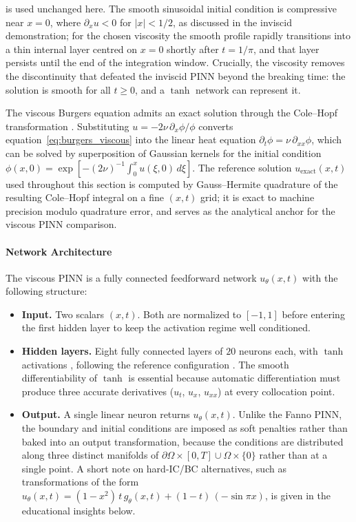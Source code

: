\documentclass[11pt,a4paper]{report}
\begin{document}
is used unchanged here. The smooth sinusoidal initial condition is compressive near $x = 0$, where $\partial_{x} u < 0$ for $|x| < 1/2$, as discussed in the inviscid demonstration; for the chosen viscosity the smooth profile rapidly transitions into a thin internal layer centred on $x = 0$ shortly after $t = 1/\pi$, and that layer persists until the end of the integration window. Crucially, the viscosity removes the discontinuity that defeated the inviscid PINN beyond the breaking time: the solution is smooth for all $t \ge 0$, and a $\tanh$ network can represent it.

The viscous Burgers equation admits an exact solution through the Cole--Hopf transformation \cite{Cole1951, Hopf1950}. Substituting $u = -2\nu\,\partial_x \phi / \phi$ converts equation~\eqref{eq:burgers_viscous} into the linear heat equation $\partial_t \phi = \nu\,\partial_{xx}\phi$, which can be solved by superposition of Gaussian kernels for the initial condition $\phi(x, 0) = \exp\!\left[-(2\nu)^{-1}\int_{0}^{x} u(\xi, 0)\,d\xi\right]$. The reference solution $u_{\mathrm{exact}}(x, t)$ used throughout this section is computed by Gauss--Hermite quadrature of the resulting Cole--Hopf integral on a fine $(x, t)$ grid; it is exact to machine precision modulo quadrature error, and serves as the analytical anchor for the viscous PINN comparison.

\paragraph{Network Architecture}
The viscous PINN is a fully connected feedforward network $u_{\theta}(x, t)$ with the following structure:

\begin{itemize}
    \item \textbf{Input.} Two scalars $(x, t)$. Both are normalized to $[-1, 1]$ before entering the first hidden layer to keep the activation regime well conditioned.
    \item \textbf{Hidden layers.} Eight fully connected layers of $20$ neurons each, with $\tanh$ activations \cite{Goodfellow2016}, following the reference configuration \cite{Raissi2019PINN}. The smooth differentiability of $\tanh$ is essential because automatic differentiation must produce three accurate derivatives ($u_t$, $u_x$, $u_{xx}$) at every collocation point.
    \item \textbf{Output.} A single linear neuron returns $u_{\theta}(x, t)$. Unlike the Fanno PINN, the boundary and initial conditions are imposed as soft penalties rather than baked into an output transformation, because the conditions are distributed along three distinct manifolds of $\partial \Omega \times [0,T] \cup \Omega \times \{0\}$ rather than at a single point. A short note on hard-IC/BC alternatives, such as transformations of the form $u_{\theta}(x,t) = (1-x^{2})\,t\,g_{\theta}(x,t) + (1-t)\,(-\sin\pi x)$, is given in the educational insights below.
\end{itemize}
\end{document}
